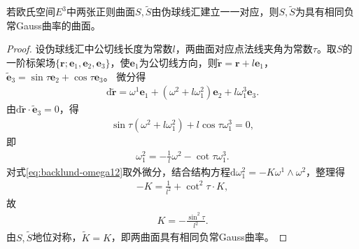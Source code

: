 \documentclass[../../main.tex]{subfiles}%
\begin{document}
\begin{theorem}[Bäcklund定理]
若欧氏空间$E^3$中两张正则曲面$S,\tilde{S}$由伪球线汇建立一一对应，则$S,\tilde{S}$为具有相同负常Gauss曲率的曲面。
\end{theorem}

\begin{proof}
设伪球线汇中公切线长度为常数$l$，两曲面对应点法线夹角为常数$\tau$。取$S$的一阶标架场$\{\boldsymbol{r};\boldsymbol{e}_1,\boldsymbol{e}_2,\boldsymbol{e}_3\}$，使$\boldsymbol{e}_1$为公切线方向，则$\tilde{\boldsymbol{r}}=\boldsymbol{r}+l\boldsymbol{e}_1$，$\tilde{\boldsymbol{e}}_3=\sin\tau\boldsymbol{e}_2+\cos\tau\boldsymbol{e}_3$。
微分得
\begin{align*}
\mathrm{d}\tilde{\boldsymbol{r}}=\omega^1\boldsymbol{e}_1+(\omega^2+l\omega_1^2)\boldsymbol{e}_2+l\omega_1^3\boldsymbol{e}_3.
\end{align*}
由$\mathrm{d}\tilde{\boldsymbol{r}}\cdot\tilde{\boldsymbol{e}}_3=0$，得
\begin{align*}
\sin\tau(\omega^2+l\omega_1^2)+l\cos\tau\omega_1^3=0,
\end{align*}
即
\begin{align}
\omega_1^2=-\frac{1}{l}\omega^2-\cot\tau\omega_1^3.\label{eq:backlund-omega12}
\end{align}
对式\eqref{eq:backlund-omega12}取外微分，结合结构方程$\mathrm{d}\omega_1^2=-K\omega^1\wedge\omega^2$，整理得
\begin{align*}
-K=\frac{1}{l^2}+\cot^2\tau\cdot K,
\end{align*}
故
\begin{align}
K=-\frac{\sin^2\tau}{l^2}.\label{eq:backlund-K}
\end{align}
由$S,\tilde{S}$地位对称，$\tilde{K}=K$，即两曲面具有相同负常Gauss曲率。
\end{proof}
\end{document}
